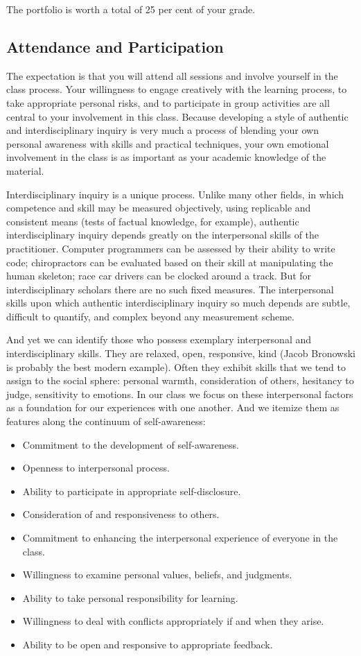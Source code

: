 \documentclass[letterpaper,10pt,headsepline]{scrreprt}
\begin{document}
The portfolio is worth a total of 25 per cent of your grade.

\subsection{Attendance and Participation}
The expectation is that you will attend all sessions and involve yourself in the class process. Your willingness to engage creatively with the learning process, to take appropriate personal risks, and to participate in group activities are all central to your involvement in this class. Because developing a style of authentic and interdisciplinary inquiry is very much a process of blending your own personal awareness with skills and practical techniques, your own emotional involvement in the class is as important as your academic knowledge of the material.

Interdisciplinary inquiry is a unique process. Unlike many other fields, in which competence and skill may be measured objectively, using replicable and consistent means (tests of factual knowledge, for example), authentic interdisciplinary inquiry depends greatly on the interpersonal skills of the practitioner. Computer programmers can be assessed by their ability to write code; chiropractors can be evaluated based on their skill at manipulating the human skeleton; race car drivers can be clocked around a track. But for interdisciplinary scholars there are no such fixed measures. The interpersonal skills upon which authentic interdisciplinary inquiry so much depends are subtle, difficult to quantify, and complex beyond any measurement scheme.

And yet we can identify those who possess exemplary interpersonal and interdisciplinary skills. They are relaxed, open, responsive, kind (Jacob Bronowski is probably the best modern example). Often they exhibit skills that we tend to assign to the social sphere: personal warmth, consideration of others, hesitancy to judge, sensitivity to emotions. In our class we focus on these interpersonal factors as a foundation for our experiences with one another. And we itemize them as features along the continuum of self-awareness:

\begin{itemize}
\item Commitment to the development of self-awareness.
\item Openness to interpersonal process.
\item Ability to participate in appropriate self-disclosure.
\item Consideration of and responsiveness to others.
\item Commitment to enhancing the interpersonal experience of everyone in the class.
\item Willingness to examine personal values, beliefs, and judgments.
\item Ability to take personal responsibility for learning.
\item Willingness to deal with conflicts appropriately if and when they arise.
\item Ability to be open and responsive to appropriate feedback.
\end{itemize}
\end{document}
